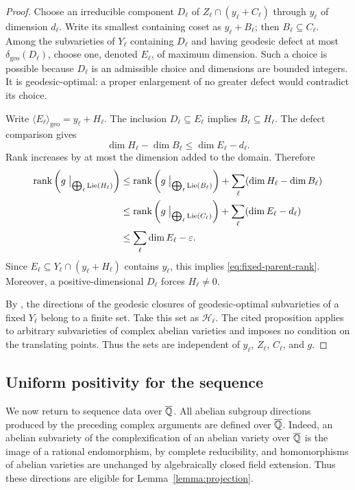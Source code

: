 \begin{proof}
Choose an irreducible component $D_\ell$ of
$Z_\ell\cap(y_\ell+C_\ell)$ through $y_\ell$ of dimension $d_\ell$.
Write its smallest containing coset as $y_\ell+B_\ell$; then
$B_\ell\subseteq C_\ell$. Among the subvarieties of $Y_\ell$
containing $D_\ell$ and having geodesic defect at most
$\delta_{\mathrm{geo}}(D_\ell)$, choose one, denoted $E_\ell$, of
maximum dimension. Such a choice is possible because $D_\ell$ is an
admissible choice and dimensions are bounded integers. It is
geodesic-optimal: a proper enlargement of no greater defect would
contradict its choice.

Write $\langle E_\ell\rangle_{\mathrm{geo}}=y_\ell+H_\ell$.
The inclusion $D_\ell\subseteq E_\ell$ implies
$B_\ell\subseteq H_\ell$. The defect comparison gives
\[
 \dim H_\ell-\dim B_\ell
 \leq\dim E_\ell-d_\ell.
\]
Rank increases by at most the dimension added to the domain. Therefore
\begin{align*}
 \operatorname{rank}\left(g\bigm|_{\bigoplus_\ell\operatorname{Lie}(H_\ell)}\right)
 &\leq
 \operatorname{rank}\left(g\bigm|_{\bigoplus_\ell\operatorname{Lie}(B_\ell)}\right)
 +\sum_\ell(\dim H_\ell-\dim B_\ell)\\
 &\leq
 \operatorname{rank}\left(g\bigm|_{\bigoplus_\ell\operatorname{Lie}(C_\ell)}\right)
 +\sum_\ell(\dim E_\ell-d_\ell)\\
 &\leq\sum_\ell\dim E_\ell-\varepsilon.
\end{align*}
Since $E_\ell\subseteq Y_\ell\cap(y_\ell+H_\ell)$ contains $y_\ell$,
this implies \eqref{eq:fixed-parent-rank}.
Moreover, a positive-dimensional $D_\ell$ forces $H_\ell\neq0$.

By \cite[Proposition~6.1]{HabeggerPila2016}, the directions of the
geodesic closures of geodesic-optimal subvarieties of a fixed
$Y_\ell$ belong to a finite set. Take this set as $\mathcal H_\ell$.
The cited proposition applies to arbitrary subvarieties of complex
abelian varieties and imposes no condition on the translating points.
Thus the sets are independent of $y_\ell$, $Z_\ell$, $C_\ell$, and $g$.
\end{proof}

\subsection{Uniform positivity for the sequence}

We now return to sequence data over $\overline{\mathbb Q}$. All abelian subgroup
directions produced by the preceding complex arguments are defined
over $\overline{\mathbb Q}$. Indeed, an abelian subvariety of the complexification
of an abelian variety over $\overline{\mathbb Q}$ is the image of a rational
endomorphism, by complete reducibility, and homomorphisms of abelian
varieties are unchanged by algebraically closed field extension.
Thus these directions are eligible for Lemma~\ref{lemma:projection}.

